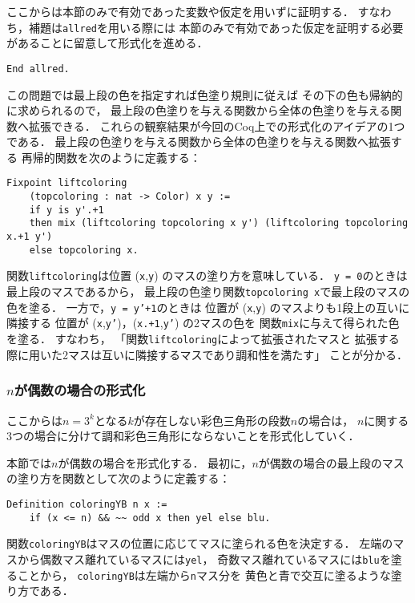 ここからは本節のみで有効であった変数や仮定を用いずに証明する．
すなわち，補題は{\tt{allred}}を用いる際には
本節のみで有効であった仮定を証明する必要があることに留意して形式化を進める．
\begin{lstlisting}[language=Coq]
  End allred.     
\end{lstlisting}

この問題では最上段の色を指定すれば色塗り規則に従えば
その下の色も帰納的に求められるので，
最上段の色塗りを与える関数から全体の色塗りを与える関数へ拡張できる．
これらの観察結果が今回のCoq上での形式化のアイデアの1つである．
最上段の色塗りを与える関数から全体の色塗りを与える関数へ拡張する
再帰的関数を次のように定義する：
\begin{lstlisting}[language=Coq]
  Fixpoint liftcoloring
    (topcoloring : nat -> Color) x y :=
    if y is y'.+1
    then mix (liftcoloring topcoloring x y') (liftcoloring topcoloring x.+1 y')
    else topcoloring x.
\end{lstlisting}
関数{\tt{liftcoloring}}は位置 ({\tt{x}},{\tt{y}}) のマスの塗り方を意味している．
{\tt{y = 0}}のときは最上段のマスであるから，
最上段の色塗り関数{\tt{topcoloring x}}で最上段のマスの色を塗る．
一方で，{\tt{y = y'+1}}のときは
位置が ({\tt{x}},{\tt{y}}) のマスよりも1段上の互いに隣接する
位置が ({\tt{x}},{\tt{y'}})，({\tt{x.+1}},{\tt{y'}}) の2マスの色を
関数{\tt{mix}}に与えて得られた色を塗る．
すなわち，
「関数{\tt{liftcoloring}}によって拡張されたマスと
  拡張する際に用いた2マスは互いに隣接するマスであり調和性を満たす」
ことが分かる．

\subsubsection{$n$が偶数の場合の形式化} \label{sec:even}
ここからは$n=3^k$となる$k$が存在しない彩色三角形の段数$n$の場合は，
$n$に関する3つの場合に分けて調和彩色三角形にならないことを形式化していく．

本節では$n$が偶数の場合を形式化する．
最初に，$n$が偶数の場合の最上段のマスの塗り方を関数として次のように定義する：
\begin{lstlisting}[language=Coq]
  Definition coloringYB n x :=
    if (x <= n) && ~~ odd x then yel else blu.
\end{lstlisting}
関数{\tt{coloringYB}}はマスの位置に応じてマスに塗られる色を決定する．
左端のマスから偶数マス離れているマスには{\tt{yel}}，
奇数マス離れているマスには{\tt{blu}}を塗ることから，
{\tt{coloringYB}}は左端から{\tt{n}}マス分を
黄色と青で交互に塗るような塗り方である．

